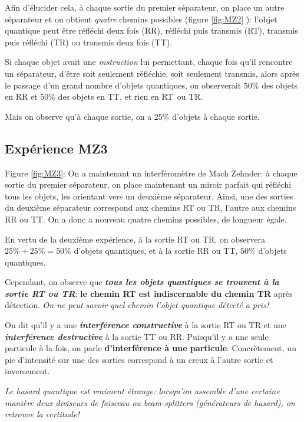 Afin d'élucider cela, à chaque sortie du premier séparateur, on place un autre
séparateur et on obtient \emph{quatre} chemins possibles (figure \ref{fig:MZ2}
): l'objet quantique peut être réfléchi deux fois (RR), réfléchi puis transmis
(RT), transmis puis réfléchi (TR) ou transmis deux fois (TT).

Si chaque objet avait une \emph{instruction} lui permettant, chaque fois qu'il
rencontre un séparateur, d'être soit seulement réfléchie, soit seulement
transmis, alors après le passage d'un grand nombre d'objets quantiques,
on observerait $50\%$ des objets en RR et $50\%$ des objets en TT, et rien en
RT\ ou TR.

Mais on observe qu'à chaque sortie, on a $25\%$ d'objets à chaque sortie.

\subsection{Expérience MZ3}

Figure \ref{fig:MZ3}: On a maintenant un interféromètre de Mach Zehnder: à
chaque sortie du premier séparateur, on place maintenant un miroir parfait qui
réfléchi tous les objets, les orientant vers un deuxième séparateur. Ainsi, une
des sorties du deuxième séparateur correspond aux chemins RT ou TR, l'autre aux
chemins RR ou TT. On a donc a nouveau quatre chemins possibles, de longueur
égale.

En vertu de la deuxième expérience, à la sortie RT ou TR, on observera
$25\%+25\%=50\%$ d'objets quantiques, et à la sortie RR ou TT, $50\%$ d'objets
quantiques.

Cependant, on observe que \emph{\textbf{tous les objets quantiques se trouvent
à la sortie RT ou TR}}: \textbf{le chemin RT est indiscernable du chemin TR}
après détection. \emph{On ne peut savoir quel chemin l'objet quantique détecté a
pris!}

On dit qu'il y a une \emph{\textbf{interférence constructive}} à la sortie RT
ou TR et une \emph{\textbf{interférence destructive}} à la sortie TT ou RR.
Puisqu'il y a une seule particule à la fois, on parle \textbf{d'interférence à
une particule}. Concrètement, un pic d'intensité sur une des sorties
correspond à un creux à l'autre sortie et inversement.

\medskip
\colorbox[gray]{0.8}{
\parbox[c]{0.9\textwidth}{
\emph{Le hasard quantique est vraiment étrange: lorsqu'on assemble d'une
certaine manière deux diviseurs de faisceau ou beam-splitters (générateurs de
hasard), on retrouve la certitude!}
}}
\medskip

